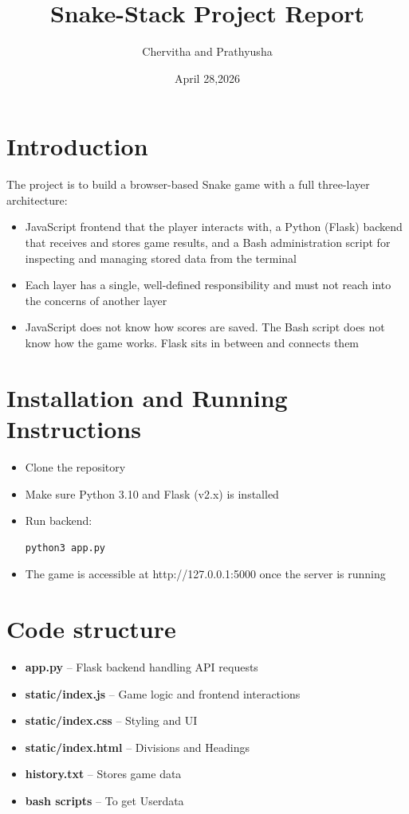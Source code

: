 \documentclass[12pt]{article}
\title{\textbf{Snake-Stack Project Report}}
\author{Chervitha and Prathyusha}
\date{April 28,2026}
\begin{document}
\maketitle

\tableofcontents
\newpage


\section{Introduction}
 The project is to build a browser-based Snake game with a full three-layer architecture: 
 

\begin{itemize}
    \item JavaScript frontend that the player interacts with, a Python (Flask) backend that receives and stores game results, and a Bash administration script for inspecting and managing stored data from the terminal
    \item Each layer has a single, well-defined responsibility and must not reach into the concerns of another layer
    \item JavaScript does not know how scores are saved. The Bash script does not know how the game works. Flask sits in between and connects them
\end{itemize}




\section{Installation and Running Instructions}

\begin{itemize}
    \item Clone the repository
    \item Make sure  Python 3.10 and Flask (v2.x) is installed 
    \item Run backend:
\begin{verbatim}
python3 app.py
\end{verbatim}
    \item The game is accessible at http://127.0.0.1:5000 once the server is running

\end{itemize}


\section{Code structure}

\begin{itemize}
    \item \textbf{app.py} – Flask backend handling API requests
    \item \textbf{static/index.js} – Game logic and frontend interactions
    \item \textbf{static/index.css} – Styling and UI
    \item \textbf{static/index.html} – Divisions and Headings
    \item \textbf{history.txt} – Stores game data
    \item \textbf{bash scripts} – To get Userdata
\end{itemize}
\end{document}
